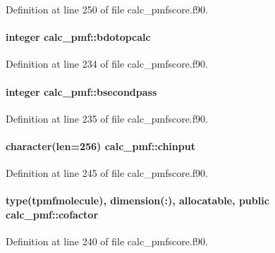 Definition at line 250 of file calc\-\_\-pmfscore.\-f90.

\hypertarget{classcalc__pmf_a6fc1809ea11117a2dcb3b452e1b6b2cc}{
\paragraph[{bdotopcalc}]{\setlength{\rightskip}{0pt plus 5cm}integer calc\-\_\-pmf\-::bdotopcalc}}\label{classcalc__pmf_a6fc1809ea11117a2dcb3b452e1b6b2cc}


Definition at line 234 of file calc\-\_\-pmfscore.\-f90.

\hypertarget{classcalc__pmf_a690cfd14223de22b294b928d0e9e2080}{
\paragraph[{bsecondpass}]{\setlength{\rightskip}{0pt plus 5cm}integer calc\-\_\-pmf\-::bsecondpass}}\label{classcalc__pmf_a690cfd14223de22b294b928d0e9e2080}


Definition at line 235 of file calc\-\_\-pmfscore.\-f90.

\hypertarget{classcalc__pmf_a2c7ec15e30c13d5d1cb9ad5727b025a9}{
\paragraph[{chinput}]{\setlength{\rightskip}{0pt plus 5cm}character(len=256) calc\-\_\-pmf\-::chinput}}\label{classcalc__pmf_a2c7ec15e30c13d5d1cb9ad5727b025a9}


Definition at line 245 of file calc\-\_\-pmfscore.\-f90.

\hypertarget{classcalc__pmf_a3e437b5cee4494c9a9445956c7b996fe}{
\paragraph[{cofactor}]{\setlength{\rightskip}{0pt plus 5cm}type({\bf tpmfmolecule}), dimension(\-:), allocatable, public calc\-\_\-pmf\-::cofactor}}\label{classcalc__pmf_a3e437b5cee4494c9a9445956c7b996fe}


Definition at line 240 of file calc\-\_\-pmfscore.\-f90.

